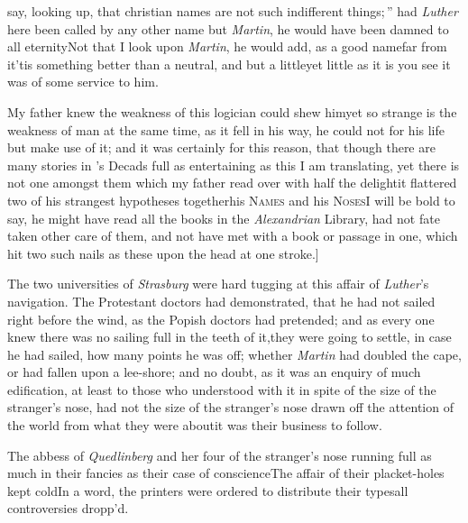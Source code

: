 \documentclass{article}
\begin{document}
\noindent
{}
say, looking up, \lqq that christian names\break
\lqq are not such indifferent things;\,”\tsk\break
had \textit{Luther} here been called by any other name but
\textit{Martin}, he would have been damned to all
eternity\tsk Not that I look upon \textit{Martin}, he would
add, as a good
name\tsk far from it\tsk ’tis something better than a
neutral, and but a little\tsk yet little as it is you see it
was of some service to him.

My father knew the weakness of this
logician could shew him\tsk yet so
strange is the weakness of man at the same time, as it fell in his
way, he could not for his life but make use of it; and it was
certainly for this reason, that though there are many stories in
’s Decads full as entertaining as
this I am translating, yet there is not one amongst them which my
father read over with half the delight\tsk it flattered
two of his strangest hypotheses together\tsk his
\textsc{Names} and his \textsc{Noses}\tsk I
will be bold to say, he might have read all the books in the
\textit{Alexandrian} Library, had not fate taken other care of them,
and not have met with a book or passage in one, which hit two such
nails as these upon the head at one stroke.]

The two universities of \textit{Strasburg} were hard tugging at
this affair of \textit{Luther}’s navigation. The Protestant
doctors had demonstrated, that he had not sailed right before the
wind, as the Popish doctors had pretended; and as every one knew
there was no sailing full in the teeth of it,\tsk they were going
to settle, in case he had sailed, how many points he was off;
whether \textit{Martin} had doubled the cape, or had fallen upon a
lee-shore; and no doubt, as it was an enquiry of much edi\-fication,
at least to those who understood  with it in spite of the
size of the stranger’s nose, had not the size of the
stranger’s nose drawn off the attention of the world from
what they were about\tsk it was their business to
follow.\tsh

\vskip -2pt

The abbess of \textit{Quedlinberg} and her four  of the stranger’s nose running full
as much in their fancies as their case of
conscience\break\tsk The affair of their placket-holes kept
cold\tsk In a word, the printers were ordered to distribute their
types\tsk all controversies dropp’d.
\end{document}
